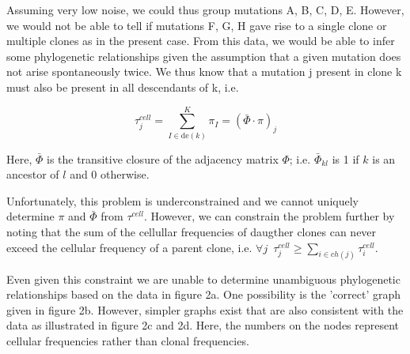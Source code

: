 \documentclass{article}
\begin{document}
Assuming very low noise, we could thus group mutations A, B, C, D, E. However, we would not be able to tell if mutations F, G, H gave rise to a single clone or multiple clones as in the present case. From this data, we would be able to infer some phylogenetic relationships given the assumption that a given mutation does not arise spontaneously twice. We thus know that a mutation j present in clone k must also be present in all descendants of k, i.e.

\begin{equation}
\tau_j^{cell} = \sum_{I \in \text{de}(k)}^K{\pi_I} = (\bar \Phi \cdot \pi)_j
\end{equation}

Here, $\bar \Phi$ is the transitive closure of the adjacency matrix $\Phi$; i.e. $\bar \Phi_{kl}$ is 1 if $k$ is an ancestor of $l$ and 0 otherwise.

Unfortunately, this problem is underconstrained and we cannot uniquely determine $\pi$ and $\bar \Phi$ from $\tau^{cell}$. However, we can constrain the problem further by noting that the sum of the cellullar frequencies of daugther clones can never exceed the cellular frequency of a parent clone, i.e. 
$\forall j \,\,\, \tau_j^{cell} \geq \sum_{i \in ch(j)} \tau_i^{cell}$.


Even given this constraint  we are unable to determine unambiguous phylogenetic relationships based on the data in figure 2a. One possibility is the 'correct' graph given in figure 2b. However, simpler graphs exist that are also consistent with the data as illustrated in figure 2c and 2d. Here, the numbers on the nodes represent cellular frequencies rather than clonal frequencies.
\end{document}
